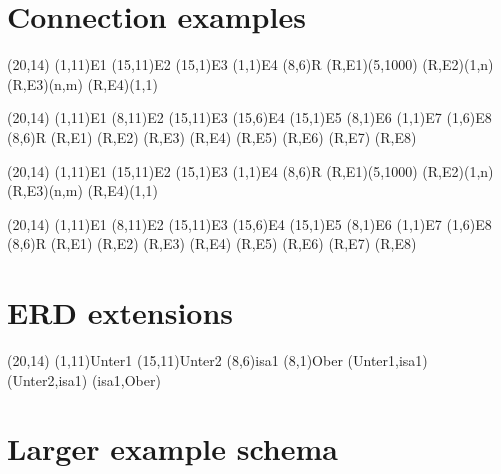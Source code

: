 \documentclass[a4paper,11pt]{article}
\begin{document}
\section{Connection examples}

\begin{schema}(20,14)
  \entity(1,11){E1}
  \entity(15,11){E2}
  \entity(15,1){E3}
  \entity(1,1){E4}
  \relation(8,6){R}
  \connection(R,E1){(5,1000)}
  \connection(R,E2){(1,n)}
  \connection(R,E3){(n,m)}
  \connection(R,E4){(1,1)}
\end{schema}

\begin{schema}(20,14)
  \entity(1,11){E1}
  \entity(8,11){E2}
  \entity(15,11){E3}
  \entity(15,6){E4}
  \entity(15,1){E5}
  \entity(8,1){E6}
  \entity(1,1){E7}
  \entity(1,6){E8}
  \relation(8,6){R}
  \connection(R,E1){}
  \connection(R,E2){}
  \connection(R,E3){}
  \connection(R,E4){}
  \connection(R,E5){}
  \connection(R,E6){}
  \connection(R,E7){}
  \connection(R,E8){}
\end{schema}

\begin{schema}(20,14)
  \entity(1,11){E1}
  \entity(15,11){E2}
  \entity(15,1){E3}
  \entity(1,1){E4}
  \relation(8,6){R}
  \conn(R,E1){(5,1000)}
  \conn(R,E2){(1,n)}
  \conn(R,E3){(n,m)}
  \conn(R,E4){(1,1)}
\end{schema}

\begin{schema}(20,14)
  \entity(1,11){E1}
  \entity(8,11){E2}
  \entity(15,11){E3}
  \entity(15,6){E4}
  \entity(15,1){E5}
  \entity(8,1){E6}
  \entity(1,1){E7}
  \entity(1,6){E8}
  \relation(8,6){R}
  \conn(R,E1){}
  \conn(R,E2){}
  \conn(R,E3){}
  \conn(R,E4){}
  \conn(R,E5){}
  \conn(R,E6){}
  \conn(R,E7){}
  \conn(R,E8){}
\end{schema}

\section{ERD extensions}

\begin{schema}(20,14)
  \entity(1,11){Unter1}
  \entity(15,11){Unter2}
  \isa(8,6){isa1}
  \entity(8,1){Ober}
  \conn(Unter1,isa1){}
  \conn(Unter2,isa1){}
  \conn(isa1,Ober){}
\end{schema}

\section{Larger example schema}
\end{document}
